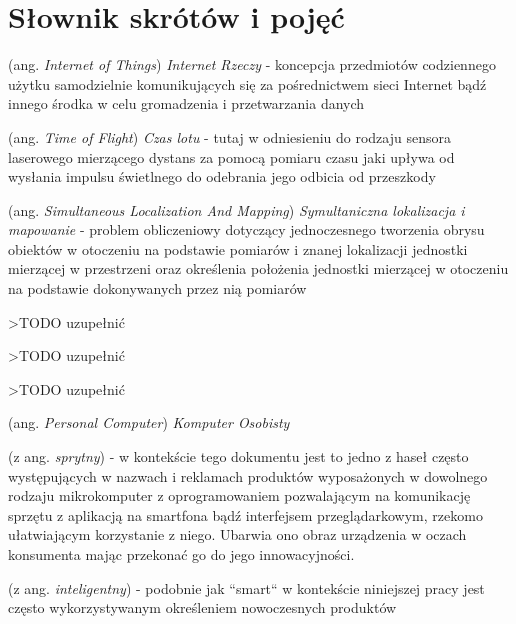 \chapter*{Słownik skrótów i pojęć}\mbox{}
\label{sec:skroty}
\noindent
\begin{description}[labelwidth=*]
  \item  [IoT] (ang. \emph{Internet of Things}) \emph{Internet Rzeczy} - koncepcja przedmiotów codziennego użytku samodzielnie komunikujących się za pośrednictwem sieci Internet bądź innego środka w celu gromadzenia i przetwarzania danych
  
  \item [ToF] (ang. \emph{Time of Flight}) \emph{Czas lotu} - tutaj w odniesieniu do rodzaju sensora laserowego mierzącego dystans za pomocą pomiaru czasu jaki upływa od wysłania impulsu świetlnego do odebrania jego odbicia od przeszkody
  
  \item [SLAM] (ang. \emph{Simultaneous Localization And Mapping}) \emph{Symultaniczna lokalizacja i mapowanie} - problem obliczeniowy dotyczący jednoczesnego tworzenia obrysu obiektów w otoczeniu na podstawie pomiarów i znanej lokalizacji jednostki mierzącej w przestrzeni oraz określenia położenia jednostki mierzącej w otoczeniu na podstawie dokonywanych przez nią pomiarów
  
  \item [VSLAM] >TODO uzupełnić
  
  \item [LIDAR] >TODO uzupełnić
  
  \item [USB-UART] >TODO uzupełnić
  
  \item [PC] (ang. \emph{Personal Computer}) \emph{Komputer Osobisty}
  
  \item [smart] (z ang. \emph{sprytny})  - w kontekście tego dokumentu jest to jedno z haseł często występujących w nazwach i reklamach produktów wyposażonych w dowolnego rodzaju mikrokomputer z oprogramowaniem pozwalającym na komunikację sprzętu z aplikacją na smartfona bądź interfejsem przeglądarkowym, rzekomo ułatwiającym korzystanie z niego. Ubarwia ono obraz urządzenia w oczach konsumenta mając przekonać go do jego innowacyjności. 
  
  \item [intelligent] (z ang. \emph{inteligentny})  - podobnie jak ``smart`` w kontekście niniejszej pracy jest często wykorzystywanym określeniem nowoczesnych produktów
  

\end{description}
